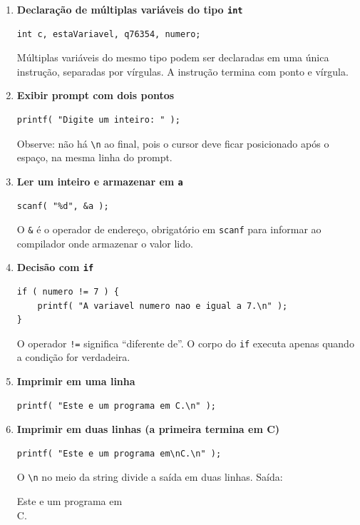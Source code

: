 \documentclass[12pt,a4paper]{article}
\begin{document}
\begin{respostabox}
\begin{enumerate}[label=\textbf{\alph*)}]

\item \textbf{Declaração de múltiplas variáveis do tipo \texttt{int}}
\begin{lstlisting}
int c, estaVariavel, q76354, numero;
\end{lstlisting}
Múltiplas variáveis do mesmo tipo podem ser declaradas em uma única instrução, separadas
por vírgulas. A instrução termina com ponto e vírgula.

\item \textbf{Exibir prompt com dois pontos}
\begin{lstlisting}
printf( "Digite um inteiro: " );
\end{lstlisting}
Observe: não há \texttt{\textbackslash n} ao final, pois o cursor deve ficar posicionado
após o espaço, na mesma linha do prompt.

\item \textbf{Ler um inteiro e armazenar em \texttt{a}}
\begin{lstlisting}
scanf( "%d", &a );
\end{lstlisting}
O \texttt{\&} é o operador de endereço, obrigatório em \texttt{scanf} para informar ao
compilador onde armazenar o valor lido.

\item \textbf{Decisão com \texttt{if}}
\begin{lstlisting}
if ( numero != 7 ) {
    printf( "A variavel numero nao e igual a 7.\n" );
}
\end{lstlisting}
O operador \texttt{!=} significa ``diferente de''. O corpo do \texttt{if} executa apenas
quando a condição for verdadeira.

\item \textbf{Imprimir em uma linha}
\begin{lstlisting}
printf( "Este e um programa em C.\n" );
\end{lstlisting}

\item \textbf{Imprimir em duas linhas (a primeira termina em C)}
\begin{lstlisting}
printf( "Este e um programa em\nC.\n" );
\end{lstlisting}
O \texttt{\textbackslash n} no meio da string divide a saída em duas linhas. Saída:
\begin{saida}
Este e um programa em\\C.
\end{saida}


\end{enumerate}
\end{respostabox}
\end{document}
